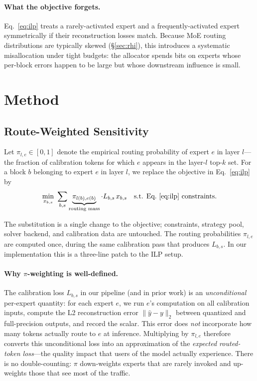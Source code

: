 \documentclass{article}
\begin{document}
\paragraph{What the objective forgets.} Eq.~\ref{eq:ilp} treats a rarely-activated expert and a frequently-activated expert symmetrically if their reconstruction losses match. Because MoE routing distributions are typically skewed (\S\ref{sec:rhi}), this introduces a systematic misallocation under tight budgets: the allocator spends bits on experts whose per-block errors happen to be large but whose downstream influence is small.

\section{Method}
\label{sec:method}

\subsection{Route-Weighted Sensitivity}

Let $\pi_{l,e} \in [0,1]$ denote the empirical routing probability of expert $e$ in layer $l$---the fraction of calibration tokens for which $e$ appears in the layer-$l$ top-$k$ set. For a block $b$ belonging to expert $e$ in layer $l$, we replace the objective in Eq.~\ref{eq:ilp} by
\begin{equation}
\label{eq:rws}
\min_{x_{b,s}} \ \sum_{b,s} \underbrace{\pi_{l(b),e(b)}}_{\text{routing mass}} \cdot L_{b,s}\, x_{b,s} \quad \text{s.t. Eq.~\ref{eq:ilp} constraints.}
\end{equation}

The substitution is a single change to the objective; constraints, strategy pool, solver backend, and calibration data are untouched. The routing probabilities $\pi_{l,e}$ are computed once, during the same calibration pass that produces $L_{b,s}$. In our implementation this is a three-line patch to the ILP setup.

\paragraph{Why $\pi$-weighting is well-defined.} The calibration loss $L_{b,s}$ in our pipeline (and in prior work) is an \emph{unconditional} per-expert quantity: for each expert $e$, we run $e$'s computation on all calibration inputs, compute the L2 reconstruction error $\| \hat{y} - y \|_2$ between quantized and full-precision outputs, and record the scalar. This error does \emph{not} incorporate how many tokens actually route to $e$ at inference. Multiplying by $\pi_{l,e}$ therefore converts this unconditional loss into an approximation of the \emph{expected routed-token loss}---the quality impact that users of the model actually experience. There is no double-counting: $\pi$ down-weights experts that are rarely invoked and up-weights those that see most of the traffic.
\end{document}
